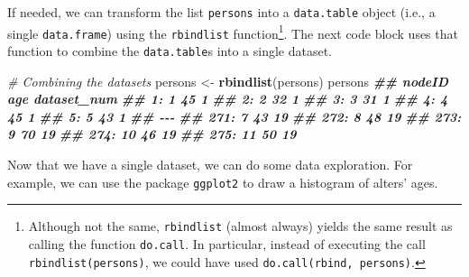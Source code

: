 \documentclass[
]{book}
\newenvironment{Shaded}{\begin{snugshade}}{\end{snugshade}}
\newcommand{\CommentTok}[1]{\textcolor[rgb]{0.56,0.35,0.01}{\textit{#1}}}
\newcommand{\ControlFlowTok}[1]{\textcolor[rgb]{0.13,0.29,0.53}{\textbf{#1}}}
\newcommand{\DecValTok}[1]{\textcolor[rgb]{0.00,0.00,0.81}{#1}}
\newcommand{\DocumentationTok}[1]{\textcolor[rgb]{0.56,0.35,0.01}{\textbf{\textit{#1}}}}
\newcommand{\FunctionTok}[1]{\textcolor[rgb]{0.13,0.29,0.53}{\textbf{#1}}}
\newcommand{\NormalTok}[1]{#1}
\newcommand{\OtherTok}[1]{\textcolor[rgb]{0.56,0.35,0.01}{#1}}
\newcommand{\SpecialCharTok}[1]{\textcolor[rgb]{0.81,0.36,0.00}{\textbf{#1}}}
\begin{document}
\begin{Shaded}
\end{Shaded}

If needed, we can transform the list \texttt{persons} into a \texttt{data.table} object (i.e., a single \texttt{data.frame}) using the \texttt{rbindlist} function\footnote{Although not the same, \texttt{rbindlist} (almost always) yields the same result as calling the function \texttt{do.call}. In particular, instead of executing the call \texttt{rbindlist(persons)}, we could have used \texttt{do.call(rbind,\ persons)}.}. The next code block uses that function to combine the \texttt{data.table}s into a single dataset.

\begin{Shaded}
\begin{Highlighting}[]
\CommentTok{\# Combining the datasets}
\NormalTok{persons }\OtherTok{\textless{}{-}} \FunctionTok{rbindlist}\NormalTok{(persons)}
\NormalTok{persons}
\DocumentationTok{\#\#      nodeID age dataset\_num}
\DocumentationTok{\#\#   1:      1  45           1}
\DocumentationTok{\#\#   2:      2  32           1}
\DocumentationTok{\#\#   3:      3  31           1}
\DocumentationTok{\#\#   4:      4  45           1}
\DocumentationTok{\#\#   5:      5  43           1}
\DocumentationTok{\#\#  {-}{-}{-}                       }
\DocumentationTok{\#\# 271:      7  43          19}
\DocumentationTok{\#\# 272:      8  48          19}
\DocumentationTok{\#\# 273:      9  70          19}
\DocumentationTok{\#\# 274:     10  46          19}
\DocumentationTok{\#\# 275:     11  50          19}
\end{Highlighting}
\end{Shaded}

Now that we have a single dataset, we can do some data exploration. For example, we can use the package \texttt{ggplot2} to draw a histogram of alters' ages.
\end{document}
